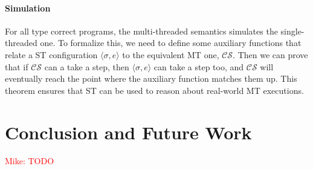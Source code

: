 \documentclass[10pt]{article}
\newcommand{\env}{\ensuremath{\sigma}}
\newcommand{\config}[2]{\ensuremath{\langle{#1},{#2}\rangle}}
\newcommand{\mwh}[1]{\textcolor{red}{Mike: #1}}
\begin{document}
\paragraph{Simulation} For all type correct programs, the
multi-threaded semantics simulates the single-threaded one. To
formalize this, we need to define some auxiliary functions that relate
a ST configuration $\config{\env}{e}$ to the equivalent MT one,
$\mathcal{CS}$. Then we can prove that if $\mathcal{CS}$ can a take a
step, then $\config{\env}{e}$ can take a step too, and $\mathcal{CS}$
will eventually reach the point where the auxiliary function matches
them up. This theorem ensures that ST can be used to reason about
real-world MT executions.

\section{Conclusion and Future Work}

\mwh{TODO}
\end{document}

